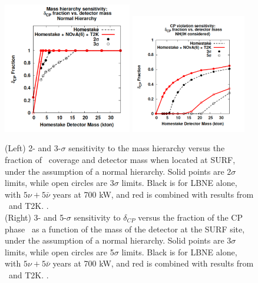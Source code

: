 \begin{figure}[htbp]
\begin{center}
\includegraphics[width=0.5\textwidth]{RWK/LBNE/TwoAndThreeSigMHSentivityVsLArMass2.pdf}
\includegraphics[width=0.45\textwidth]{RWK/LBNE/CPCoverageFractionVsMassSURF22.pdf}
\caption{(Left) 2- and 3-$\sigma$ sensitivity to the mass hierarchy versus the fraction of  \deltacp\ coverage  and detector mass when located at SURF, under the assumption of a normal hierarchy. Solid points are  2$\sigma$ limits, while open circles are 3$\sigma$ limits. Black is for LBNE alone, with $5\nu+5\bar{\nu} $ years at 700 kW, and red is combined with results from \Nova\ and T2K. \cite{PWGReconfigurationReport}. \\ (Right) 3- and 5-$\sigma$ sensitivity to $\delta_{CP}$ versus the fraction of the CP phase \deltacp\ as a function of the mass of the detector at the SURF site, under the assumption of a normal hierarchy. Solid points are  3$\sigma$ limits, while open circles are 5$\sigma$ limits. Black is for LBNE alone, with $5\nu+5\bar{\nu} $ years at 700 kW, and red is combined with results from \Nova\ and T2K. \cite{PWGReconfigurationReport}.}
\label{fig:MHsensitivityVsSize}
\end{center}
\end{figure}



